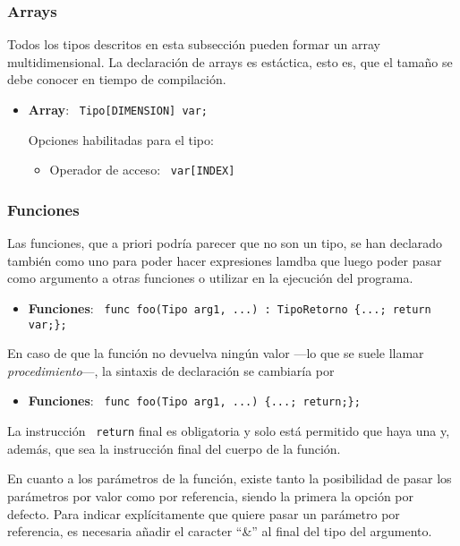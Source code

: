 \documentclass[10pt,a4paper]{article}
\begin{document}
\subsubsection{Arrays}
Todos los tipos descritos en esta subsección pueden formar un array multidimensional. La declaración de arrays es estáctica, esto es, que el tamaño se debe conocer en tiempo de compilación. 
\begin{itemize}
    \item \textbf{Array}: \texttt{\color{blue} Tipo[DIMENSION] var;}
    
    Opciones habilitadas para el tipo:
    \begin{itemize}
        \item Operador de acceso: \texttt{\color{blue} var[INDEX]}
    \end{itemize}
\end{itemize}



\subsubsection{Funciones}
Las funciones, que a priori podría parecer que no son un tipo, se han declarado también como uno para poder hacer expresiones lamdba que luego poder pasar como argumento a otras funciones o utilizar en la ejecución del programa. 
\begin{itemize}
    \item \textbf{Funciones}: \texttt{\color{blue} func foo(Tipo arg1, ...) : TipoRetorno \{...; return var;\};}
\end{itemize}
En caso de que la función no devuelva ningún valor ---lo que se suele llamar \textit{procedimiento}---, la sintaxis de declaración se cambiaría por
\begin{itemize}
    \item \textbf{Funciones}: \texttt{\color{blue} func foo(Tipo arg1, ...) \{...; return;\};}
\end{itemize}

La instrucción \texttt{\color{blue} return} final es obligatoria y solo está permitido que haya una y, además, que sea la instrucción final del cuerpo de la función.

En cuanto a los parámetros de la función, existe tanto la posibilidad de pasar los parámetros por valor como por referencia, siendo la primera la opción por defecto. Para indicar explícitamente que quiere pasar un parámetro por referencia, es necesaria añadir el caracter ``\&'' al final del tipo del argumento.
\end{document}
